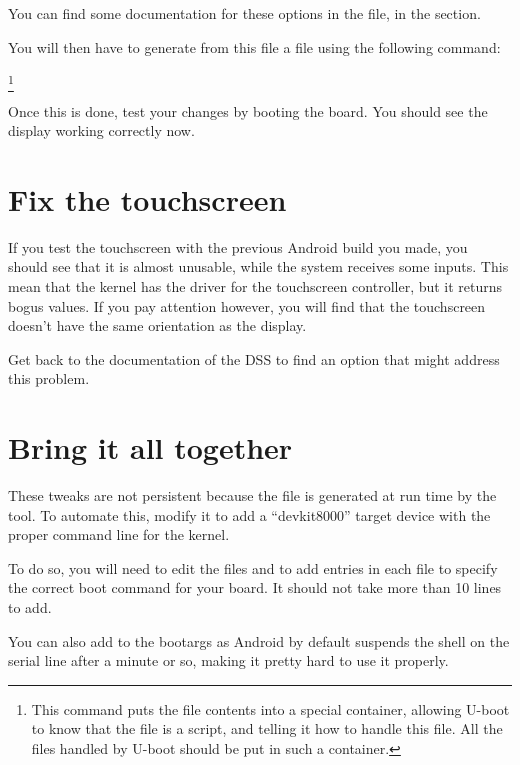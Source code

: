 You can find some documentation for these options in the
 file, in the  section.

You will then have to generate from this  file a  file
using the following command:

\footnote{This command puts the  file contents into a special container,
allowing U-boot to know that the  file is a script, and telling it how to handle
this file. All the files handled by U-boot should be put in such a container.}
 
Once this is done, test your changes by booting the board. You should see the
display working correctly now.

\section{Fix the touchscreen}

If you test the touchscreen with the previous Android build you made, you should
see that it is almost unusable, while the system receives some inputs. This mean
that the kernel has the driver for the touchscreen controller, but it returns
bogus values. If you pay attention however, you will find that the touchscreen
doesn't have the same orientation as the display.

Get back to the documentation of the DSS to find an option that might address
this problem.

\section{Bring it all together}

These tweaks are not persistent because the  file is generated at run
time by the  tool. To automate this, modify it to add
a ``devkit8000'' target device with the proper command line for the kernel.

To do so, you will need to edit the files
 and
 to add  entries in each
file to specify the correct boot command for your board. It should not take more than 10 lines to
add.

You can also add  to the bootargs as Android by
default suspends the shell on the serial line after a minute or so, making it pretty
hard to use it properly.

